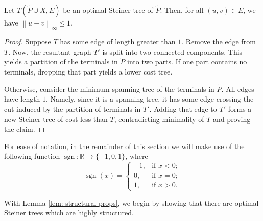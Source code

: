 \documentclass{article}\providecommand{\DeclareRedundantLanguages}[2]{}\usepackage[a4paper,margin=20mm]{geometry}
\newcommand{\R}{\mathbb{R}}
\DeclareMathOperator{\sgn}{sgn}
\newcommand{\1}{\textbf{1}}
\newcommand{\norm}[1]{\left\lVert#1\right\rVert}
\renewcommand{\tilde}{\widetilde}
\begin{document}
\begin{lemma} \label{lem: max dist}
Let $T(\tilde{P} \cup X, E)$ be an optimal Steiner tree of $\tilde{P}$. Then, for all $(u,v) \in E$, we have $\norm{u - v}_{\infty} \leq 1.$
\end{lemma}
\begin{proof}
Suppose $T$ has some edge of length greater than $1$. Remove the edge from $T$. Now, the resultant graph $T'$ is split into two connected components. This yields a partition of the terminals in $\tilde{P}$ into two parts. If one part contains no terminals, dropping that part yields a lower cost tree. 

Otherwise,  consider the minimum spanning tree of the terminals in $\tilde{P}$. All edges have length $1$. Namely, since it is a spanning tree, it has some edge crossing the cut induced by the partition of terminals in $T'$. Adding that edge to $T'$ forms a new Steiner tree of cost less than $T$, contradicting minimality of $T$ and proving the claim.
\end{proof}

 For ease of notation, in the remainder of this section we will make use of the following function $\sgn: \R \to \{-1, 0, 1\}$, where 
\[
\sgn(x) = \begin{cases} 
-1, &\text{if } x < 0;\\
0, &\text{if } x = 0;\\
1, &\text{if } x > 0.
\end{cases}
\]

With Lemma \ref{lem: structural props}, we begin by showing that there are optimal Steiner trees which are highly structured.
\end{document}
